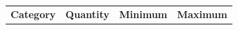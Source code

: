 {{    \addtocounter{footnote}{-0}
    
          }{ %
        
    
        \begin{center}
      
      \label{m30853*id67638}
      
    \noindent
      \tablelasttail{}
      \begin{xtabular}[t]{|l|l|l|l|}\hline
    
    
        
                \textbf{Category}
               &
    
    
        
                \textbf{Quantity}
               &
    
    
        
                \textbf{Minimum}
               &
    
    
        
                \textbf{Maximum}
     \tabularnewline{}
    
    

\end{xtabular}
\end{center}}}
